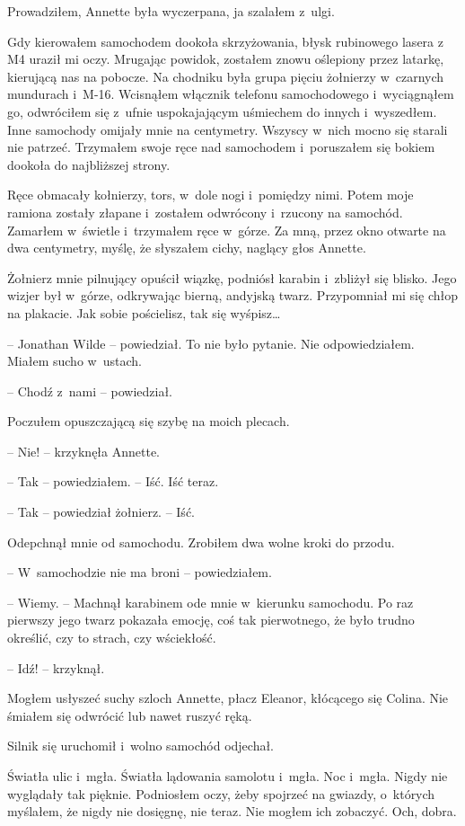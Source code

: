 \documentclass[oneside,polish,11pt,sfheadings]{mwbk}
\begin{document}
Prowadziłem, Annette była wyczerpana, ja szalałem z~ulgi.

Gdy kierowałem samochodem dookoła skrzyżowania, błysk rubinowego lasera
z M4 uraził mi oczy. Mrugając powidok, zostałem znowu oślepiony przez
latarkę, kierującą nas na pobocze. Na chodniku była grupa pięciu
żołnierzy w~czarnych mundurach i~M-16. Wcisnąłem włącznik telefonu
samochodowego i~wyciągnąłem go, odwróciłem się z~ufnie uspokajającym
uśmiechem do innych i~wyszedłem. Inne samochody omijały mnie na
centymetry. Wszyscy w~nich mocno się starali nie patrzeć. Trzymałem
swoje ręce nad samochodem i~poruszałem się bokiem dookoła do najbliższej
strony.

Ręce obmacały kołnierzy, tors, w~dole nogi i~pomiędzy nimi. Potem moje
ramiona zostały złapane i~zostałem odwrócony i~rzucony na samochód.
Zamarłem w~świetle i~trzymałem ręce w~górze. Za mną, przez okno otwarte
na dwa centymetry, myślę, że słyszałem cichy, naglący głos Annette.

Żołnierz mnie pilnujący opuścił wiązkę, podniósł karabin i~zbliżył się
blisko. Jego wizjer był w~górze, odkrywając bierną, andyjską twarz.
Przypomniał mi się chłop na plakacie. Jak sobie pościelisz, tak się
wyśpisz\ldots

-- Jonathan Wilde -- powiedział. To nie było pytanie. Nie odpowiedziałem.
Miałem sucho w~ustach.

-- Chodź z~nami -- powiedział.

Poczułem opuszczającą się szybę na moich plecach.

-- Nie! -- krzyknęła Annette.

-- Tak -- powiedziałem. -- Iść. Iść teraz.

-- Tak -- powiedział żołnierz. -- Iść.

Odepchnął mnie od samochodu. Zrobiłem dwa wolne kroki do przodu. 

-- W~samochodzie nie ma broni -- powiedziałem.

-- Wiemy. -- Machnął karabinem ode mnie w~kierunku samochodu. Po raz
pierwszy jego twarz pokazała emocję, coś tak pierwotnego, że było trudno
określić, czy to strach, czy wściekłość.

-- Idź! -- krzyknął.

Mogłem usłyszeć suchy szloch Annette, płacz Eleanor, kłócącego się
Colina. Nie śmiałem się odwrócić lub nawet ruszyć ręką.

Silnik się uruchomił i~wolno samochód odjechał.

Światła ulic i~mgła. Światła lądowania samolotu i~mgła. Noc i~mgła.
Nigdy nie wyglądały tak pięknie. Podniosłem oczy, żeby spojrzeć na
gwiazdy, o~których myślałem, że nigdy nie dosięgnę, nie teraz. Nie
mogłem ich zobaczyć. Och, dobra.
\end{document}
